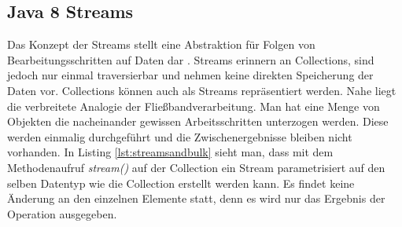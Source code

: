\subsection{Java 8 Streams}
Das Konzept der Streams stellt eine Abstraktion für Folgen von Bearbeitungsschritten auf Daten dar \cite{Inden.2015}. Streams erinnern an Collections, sind jedoch nur einmal traversierbar und nehmen keine direkten Speicherung der Daten vor. Collections können auch als Streams repräsentiert werden. Nahe liegt die verbreitete Analogie der Fließbandverarbeitung. Man hat eine Menge von Objekten die nacheinander gewissen Arbeitsschritten unterzogen werden. Diese werden einmalig durchgeführt und die Zwischenergebnisse bleiben nicht vorhanden. In Listing \ref{lst:streamsandbulk} sieht man, dass mit dem Methodenaufruf \textit{stream()} auf der Collection ein Stream parametrisiert auf den selben Datentyp wie die Collection erstellt werden kann. Es findet keine Änderung an den einzelnen Elemente statt, denn es wird nur das Ergebnis der Operation ausgegeben.

